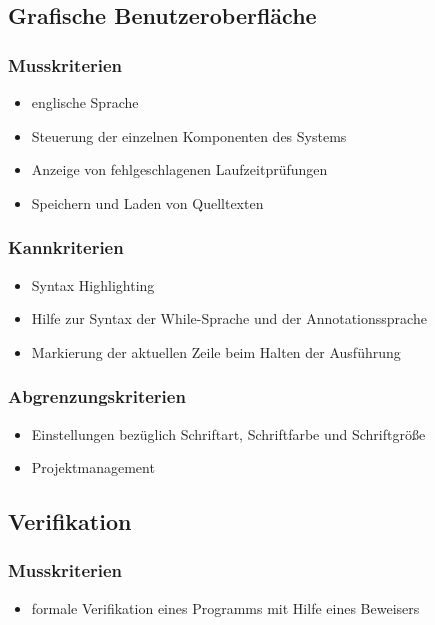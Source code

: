 \documentclass[a4paper,10pt]{article}
\begin{document}
\subsection{Grafische Benutzeroberfl\"{a}che}
\subsubsection{Musskriterien}
\begin{itemize}
  \item englische Sprache
  \item Steuerung der einzelnen Komponenten des Systems
  \item Anzeige von fehlgeschlagenen Laufzeitpr\"{u}fungen
  \item Speichern und Laden von Quelltexten
\end{itemize}
\subsubsection{Kannkriterien}
\begin{itemize}
  \item Syntax Highlighting
  \item Hilfe zur Syntax der While-Sprache und der Annotationssprache
  \item Markierung der aktuellen Zeile beim Halten der Ausf\"{u}hrung
\end{itemize}
\subsubsection{Abgrenzungskriterien}
\begin{itemize}
  \item Einstellungen bez\"{u}glich Schriftart, Schriftfarbe und Schriftgr\"{o}\ss{}e
  \item Projektmanagement
\end{itemize}

\subsection{Verifikation}
\subsubsection{Musskriterien}
\begin{itemize}
  \item formale Verifikation eines Programms mit Hilfe eines Beweisers
\end{itemize}
\end{document}
